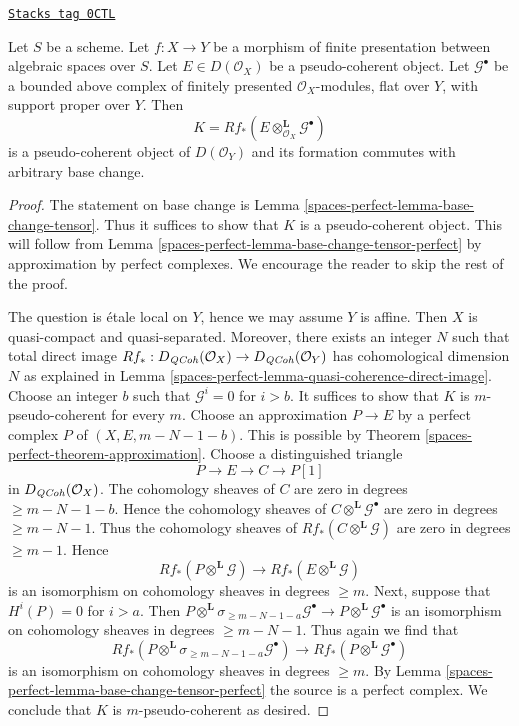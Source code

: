 \begin{lemma}
\label{spaces-perfect-lemma-base-change-tensor-pseudo-coherent}
\href{https://stacks.math.columbia.edu/tag/0CTL}{\texttt{Stacks tag 0CTL}}

Let $S$ be a scheme.
Let $f : X \to Y$ be a morphism of finite presentation
between algebraic spaces over $S$.
Let $E \in D(\mathcal{O}_X)$ be a pseudo-coherent object.
Let $\mathcal{G}^\bullet$ be a bounded above complex of
finitely presented $\mathcal{O}_X$-modules,
flat over $Y$, with support proper over $Y$. Then
$$
K = Rf_*(E \otimes_{\mathcal{O}_X}^\mathbf{L} \mathcal{G}^\bullet)
$$
is a pseudo-coherent object of $D(\mathcal{O}_Y)$ and its formation
commutes with arbitrary base change.
\end{lemma}

\begin{proof}
The statement on base change is Lemma \ref{spaces-perfect-lemma-base-change-tensor}.
Thus it suffices to show that $K$ is a pseudo-coherent object.
This will follow from Lemma \ref{spaces-perfect-lemma-base-change-tensor-perfect}
by approximation by perfect complexes. We encourage the reader to
skip the rest of the proof.

\medskip\noindent
The question is \'etale local on $Y$, hence we may assume $Y$ is affine.
Then $X$ is quasi-compact and quasi-separated. Moreover, there
exists an integer $N$ such that total direct image
$Rf_* : D_{\mathit{QCoh}}(\mathcal{O}_X) \to D_{\mathit{QCoh}}(\mathcal{O}_Y)$
has cohomological dimension $N$ as explained in
Lemma \ref{spaces-perfect-lemma-quasi-coherence-direct-image}.
Choose an integer $b$ such that $\mathcal{G}^i = 0$ for $i > b$.
It suffices to show that $K$ is $m$-pseudo-coherent for
every $m$. Choose an approximation $P \to E$ by a perfect complex $P$
of $(X, E, m - N - 1 - b)$. This is possible by
Theorem \ref{spaces-perfect-theorem-approximation}.
Choose a distinguished triangle
$$
P \to E \to C \to P[1]
$$
in $D_{\mathit{QCoh}}(\mathcal{O}_X)$. The cohomology sheaves of $C$ are zero
in degrees $\geq m - N - 1 - b$. Hence
the cohomology sheaves of $C \otimes^\mathbf{L} \mathcal{G}^\bullet$
are zero in degrees $\geq m - N - 1$.
Thus the cohomology sheaves of $Rf_*(C \otimes^\mathbf{L} \mathcal{G})$
are zero in degrees $\geq m - 1$. Hence
$$
Rf_*(P \otimes^\mathbf{L} \mathcal{G}) \to
Rf_*(E \otimes^\mathbf{L} \mathcal{G})
$$
is an isomorphism on cohomology sheaves in degrees $\geq m$.
Next, suppose that $H^i(P) = 0$ for $i > a$. Then
$
P \otimes^\mathbf{L} \sigma_{\geq m - N - 1 - a}\mathcal{G}^\bullet
\longrightarrow
P \otimes^\mathbf{L} \mathcal{G}^\bullet
$
is an isomorphism on cohomology sheaves in degrees $\geq m - N - 1$.
Thus again we find that
$$
Rf_*(P \otimes^\mathbf{L} \sigma_{\geq m - N - 1 - a}\mathcal{G}^\bullet) \to
Rf_*(P \otimes^\mathbf{L} \mathcal{G}^\bullet)
$$
is an isomorphism on cohomology sheaves in degrees $\geq m$.
By Lemma \ref{spaces-perfect-lemma-base-change-tensor-perfect} the source
is a perfect complex.
We conclude that $K$ is $m$-pseudo-coherent as desired.
\end{proof}

